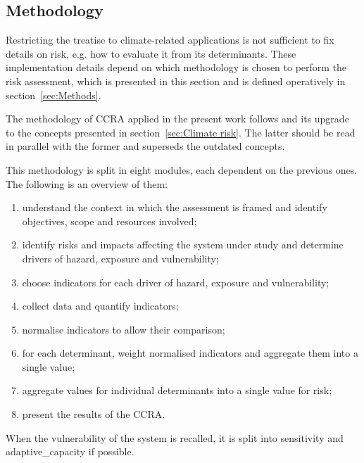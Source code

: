 \subsection{Methodology}
\label{sec:Methodology}
Restricting the treatise to climate-related applications is not sufficient to fix details on \gls{risk}, e.g. how to evaluate it from its \glspl{determinant}. These implementation details depend on which methodology is chosen to perform the risk assessment, which is presented in this section and is defined operatively in section~\ref{sec:Methods}.

The methodology of \gls{CCRA} applied in the present work follows \cite{2017GIZTheVulnerability} and its upgrade \cite{2017GIZRiskSupplement} to the concepts presented in section~\ref{sec:Climate risk}. The latter should be read in parallel with the former and superseds the outdated concepts.

This methodology is split in eight modules, each dependent on the previous ones. The following is an overview of them:
\begin{enumerate}
  \item understand the context in which the assessment is framed and identify objectives, scope and resources involved;\cite[39-53]{2017GIZTheVulnerability}
  \item \label{itm:module_2} identify \glspl{risk} and \glspl{impact} affecting the system under study and determine \glspl{driver} of \gls{hazard}, \gls{exposure} and \gls{vulnerability};\cite[26-41]{2017GIZRiskSupplement}
  \item \label{itm:module_3} choose \glspl{indicator} for each \gls{driver} of \gls{hazard}, \gls{exposure} and \gls{vulnerability};\cite[73-84]{2017GIZTheVulnerability}
  \item \label{itm:module_4} collect data and quantify \glspl{indicator};\cite[87-103]{2017GIZTheVulnerability}
  \item \label{itm:module_5} normalise \glspl{indicator} to allow their comparison;\cite[105-119]{2017GIZTheVulnerability}
  \item \label{itm:module_6} for each \gls{determinant}, weight normalised \glspl{indicator} and aggregate them into a single value;\cite[121-131]{2017GIZTheVulnerability}
  \item \label{itm:module_7} aggregate values for individual \glspl{determinant} into a single value for \gls{risk};\cite[133-141]{2017GIZTheVulnerability}
  \item present the results of the \gls{CCRA}.\cite[143-154]{2017GIZTheVulnerability}
\end{enumerate}
When the \gls{vulnerability} of the system is recalled, it is split into \gls{sensitivity} and \gls{adaptive_capacity} if possible.

